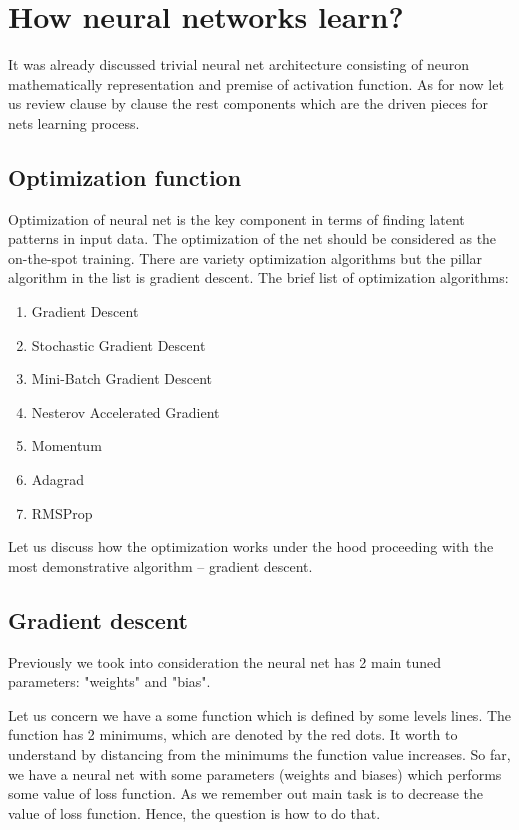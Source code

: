 \documentclass{article}
\begin{document}
\section{How neural networks learn?}
It was already discussed trivial neural net architecture consisting of neuron mathematically representation and premise of activation function. As for now let us review clause by clause the rest components which are the driven pieces for nets learning process.

\subsection{Optimization function}
Optimization of neural net is the key component in terms of finding latent patterns in input data. The optimization of the net should be considered as the on-the-spot training. There are variety optimization algorithms but the pillar algorithm in the list is gradient descent.
The brief list of optimization algorithms:
\begin{enumerate}
    \item Gradient Descent
    \item Stochastic Gradient Descent
    \item Mini-Batch Gradient Descent
    \item Nesterov Accelerated Gradient
    \item Momentum
    \item Adagrad
    \item RMSProp
\end{enumerate}
Let us discuss how the optimization works under the hood proceeding with the most demonstrative algorithm -- gradient descent.

\subsection{Gradient descent}
Previously we took into consideration the neural net has 2 main tuned parameters: "weights" and "bias".

Let us concern we have a some function which is defined by some levels lines. The function has 2 minimums, which are denoted by the red dots.  It worth to understand by distancing from the minimums the function value increases. 
So far, we have a neural net with some parameters (weights and biases) which performs some value of loss function. As we remember out main task is to decrease the value of loss function. Hence, the question is how to do that.
\end{document}
